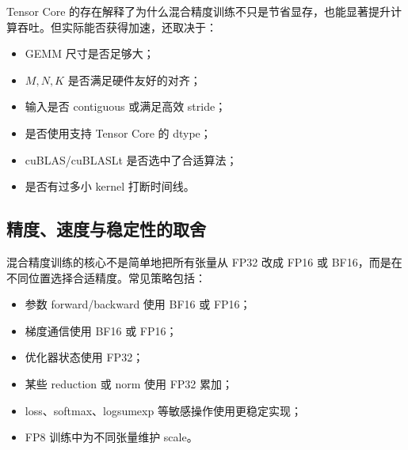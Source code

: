 Tensor Core 的存在解释了为什么混合精度训练不只是节省显存，也能显著提升计算吞吐。但实际能否获得加速，还取决于：

\begin{itemize}
\item GEMM 尺寸是否足够大；
\item $M,N,K$ 是否满足硬件友好的对齐；
\item 输入是否 contiguous 或满足高效 stride；
\item 是否使用支持 Tensor Core 的 dtype；
\item cuBLAS/cuBLASLt 是否选中了合适算法；
\item 是否有过多小 kernel 打断时间线。
\end{itemize}

\subsection{精度、速度与稳定性的取舍}
\label{subsec:precision-speed-stability-tradeoff}

混合精度训练的核心不是简单地把所有张量从 FP32 改成 FP16 或 BF16，而是在不同位置选择合适精度。常见策略包括：

\begin{itemize}
\item 参数 forward/backward 使用 BF16 或 FP16；
\item 梯度通信使用 BF16 或 FP16；
\item 优化器状态使用 FP32；
\item 某些 reduction 或 norm 使用 FP32 累加；
\item loss、softmax、logsumexp 等敏感操作使用更稳定实现；
\item FP8 训练中为不同张量维护 scale。
\end{itemize}


